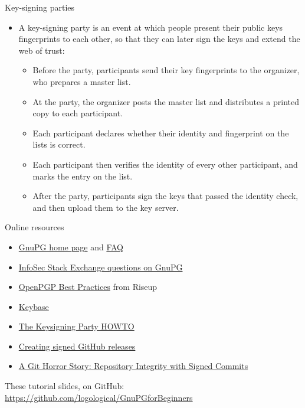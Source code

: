 \documentclass[
mode=present,
paper=smartboard,
size=20pt,
]{powerdot}
\begin{document}
\begin{slide}{Key-signing parties}
  \begin{itemize}
  \item A key-signing party is an event at which people present their
    public keys fingerprints to each other, so that they can later
    sign the keys and extend the web of trust:
    \begin{itemize}
    \item Before the party, participants send their key fingerprints
      to the organizer, who prepares a master list.
    \item At the party, the organizer posts the master list and
      distributes a printed copy to each participant.
    \item Each participant declares whether their identity and
      fingerprint on the lists is correct.
    \item Each participant then verifies the identity of every other
      participant, and marks the entry on the list.
    \item After the party, participants sign the keys that passed the
      identity check, and then upload them to the key server.
    \end{itemize}
  \end{itemize}
\end{slide}

\begin{slide}{Online resources}
  \begin{itemize}
  \item \href{https://gnupg.org/}{GnuPG home page} and \href{https://www.gnupg.org/faq/gnupg-faq.html}{FAQ}
  \item \href{http://security.stackexchange.com/questions/tagged/gnupg}{InfoSec Stack Exchange questions on GnuPG}
  \item \href{https://riseup.net/en/security/message-security/openpgp/best-practices}{OpenPGP Best Practices} from Riseup
  \item \href{https://keybase.io/}{Keybase}
  \item \href{http://cryptnet.net/fdp/crypto/keysigning_party/en/keysigning_party.html}{The Keysigning Party HOWTO}
  \item
    \href{https://wiki.debian.org/Creating\%20signed\%20GitHub\%20releases}{Creating
      signed GitHub releases}
  \item \href{https://mikegerwitz.com/papers/git-horror-story}{A Git
      Horror Story: Repository Integrity with Signed Commits}
  \end{itemize}

  \centering
  These tutorial slides, on GitHub:\\
  \href{https://github.com/logological/GnuPGforBeginners}{https://github.com/logological/GnuPGforBeginners}

\end{slide}
\end{document}
